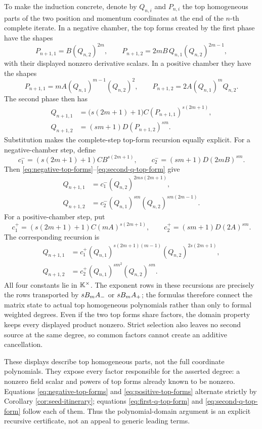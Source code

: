 \documentclass[11pt]{article}
\theoremstyle{definition}
\theoremstyle{remark}
\begin{document}
To make the induction concrete, denote by \(Q_{n,i}\) and \(P_{n,i}\) the
top homogeneous parts of the two position and momentum coordinates at the end
of the \(n\)-th complete iterate.  In a negative chamber, the top forms
created by the first phase have the shapes
\begin{equation}
P_{n+1,1}=B(Q_{n,2})^{2m},
\qquad
P_{n+1,2}=2mB\,Q_{n,1}(Q_{n,2})^{2m-1},
\label{eq:negative-top-forms}
\end{equation}
with their displayed nonzero derivative scalars.  In a positive chamber they
have the shapes
\begin{equation}
P_{n+1,1}=mA(Q_{n,1})^{m-1}(Q_{n,2})^2,
\qquad
P_{n+1,2}=2A(Q_{n,1})^mQ_{n,2}.
\label{eq:positive-top-forms}
\end{equation}
The second phase then has
\begin{align}
Q_{n+1,1}
&=\bigl(s(2m+1)+1\bigr)C
  (P_{n+1,1})^{s(2m+1)},
\label{eq:first-q-top-form}\\
Q_{n+1,2}
&=(sm+1)D(P_{n+1,2})^{sm}.
\label{eq:second-q-top-form}
\end{align}
Substitution makes the complete-step top-form recursion equally explicit.
For a negative-chamber step, define
\[
c_1^-=(s(2m+1)+1)C B^{s(2m+1)},
\qquad
c_2^-=(sm+1)D(2mB)^{sm}.
\]
Then \eqref{eq:negative-top-forms}--\eqref{eq:second-q-top-form}
give
\begin{align*}
Q_{n+1,1}
&=c_1^-(Q_{n,2})^{2ms(2m+1)},\\
Q_{n+1,2}
&=c_2^-(Q_{n,1})^{sm}(Q_{n,2})^{sm(2m-1)}.
\end{align*}
For a positive-chamber step, put
\[
c_1^+=(s(2m+1)+1)C(mA)^{s(2m+1)},
\qquad
c_2^+=(sm+1)D(2A)^{sm}.
\]
The corresponding recursion is
\begin{align*}
Q_{n+1,1}
&=c_1^+(Q_{n,1})^{s(2m+1)(m-1)}
             (Q_{n,2})^{2s(2m+1)},\\
Q_{n+1,2}
&=c_2^+(Q_{n,1})^{sm^2}(Q_{n,2})^{sm}.
\end{align*}
All four constants lie in \(\mathbb{K}^\times\).  The exponent rows in these
recursions are precisely the rows transported by \(sB_mA_{-}\) or
\(sB_mA_{+}\); the formulas therefore connect the matrix state to actual top
homogeneous polynomials rather than only to formal weighted degrees.  Even
if the two top forms share factors, the domain property keeps every displayed
product nonzero.  Strict selection also leaves no second source at the same
degree, so common factors cannot create an additive cancellation.

These displays describe top homogeneous parts, not the full coordinate
polynomials.  They expose every factor responsible for the asserted degree:
a nonzero field scalar and powers of top forms already known to be nonzero.
Equations \eqref{eq:negative-top-forms} and
\eqref{eq:positive-top-forms} alternate strictly by Corollary
\ref{cor:seed-itinerary}; equations \eqref{eq:first-q-top-form} and
\eqref{eq:second-q-top-form} follow each of them.  Thus the polynomial-domain
argument is an explicit recursive certificate, not an appeal to generic
leading terms.
\end{document}
